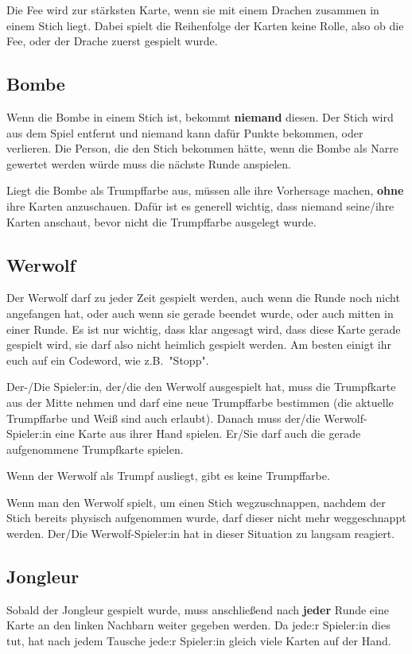 \documentclass[3pt]{article}
\begin{document}
Die Fee wird zur stärksten Karte, wenn sie mit einem Drachen zusammen in einem Stich liegt.
Dabei spielt die Reihenfolge der Karten keine Rolle, also ob die Fee, oder der Drache zuerst gespielt wurde.

\subsection{Bombe}
Wenn die Bombe in einem Stich ist, bekommt \textbf{niemand} diesen.
Der Stich wird aus dem Spiel entfernt und niemand kann dafür Punkte bekommen, oder verlieren.
Die Person, die den Stich bekommen hätte, wenn die Bombe als Narre gewertet werden würde muss die nächste Runde anspielen. %

Liegt die Bombe als Trumpffarbe aus, müssen alle ihre Vorhersage machen, \textbf{ohne} ihre Karten anzuschauen.
Dafür ist es generell wichtig, dass niemand seine/ihre Karten anschaut, bevor nicht die Trumpffarbe ausgelegt wurde.

\subsection{Werwolf}
Der Werwolf darf zu jeder Zeit gespielt werden, auch wenn die Runde noch nicht angefangen hat, oder auch wenn sie gerade beendet wurde, oder auch mitten in einer Runde.
Es ist nur wichtig, dass klar angesagt wird, dass diese Karte gerade gespielt wird, sie darf also nicht heimlich gespielt werden.
Am besten einigt ihr euch auf ein Codeword, wie z.B.~"Stopp".

Der-/Die Spieler:in, der/die den Werwolf ausgespielt hat, muss die Trumpfkarte aus der Mitte nehmen und darf eine neue Trumpffarbe bestimmen (die aktuelle Trumpffarbe und Weiß sind auch erlaubt).
Danach muss der/die Werwolf-Spieler:in eine Karte aus ihrer Hand spielen.
Er/Sie darf auch die gerade aufgenommene Trumpfkarte spielen.

Wenn der Werwolf als Trumpf ausliegt, gibt es keine Trumpffarbe.

Wenn man den Werwolf spielt, um einen Stich wegzuschnappen, nachdem der Stich bereits physisch aufgenommen wurde, darf dieser nicht mehr weggeschnappt werden.
Der/Die Werwolf-Spieler:in hat in dieser Situation zu langsam reagiert.

\subsection{Jongleur}
Sobald der Jongleur gespielt wurde, muss anschließend nach \textbf{jeder} Runde eine Karte an den linken Nachbarn weiter gegeben werden.
Da jede:r Spieler:in dies tut, hat nach jedem Tausche jede:r Spieler:in gleich viele Karten auf der Hand.
\end{document}
